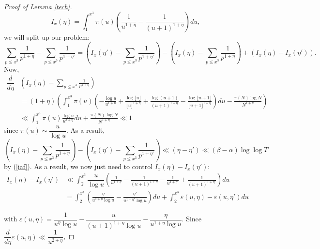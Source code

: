 \documentclass{article}
\newcommand{\1}{\mathds{1}}
\numberwithin{equation}{section}
\newcommand{\eps}{\varepsilon}
\renewcommand{\leq}{\leqslant}
\theoremstyle{plain} %
\begin{document}
\begin{proof}[Proof of Lemma \ref{tech}]
\begin{equation}
    I_x(\eta) = \int_1^{x^3} \pi(u)(\frac{1}{u^{1+\eta}} - \frac{1}{(u+1)^{1 + \eta}})du,
\end{equation}
we will split up our problem:
\begin{equation}
    \sum_{p \leq x^3} \frac{1}{p^{1 + \eta}} - \sum_{p \leq x^3} \frac{1}{p^{1 + \eta'}} = \left(I_x(\eta')  - \sum_{p \leq x^3} \frac{1}{p^{1 + \eta'}} \right) - \left(I_x(\eta)  - \sum_{p \leq x^3} \frac{1}{p^{1 + \eta}} \right) + (I_x(\eta) - I_x(\eta')).
\end{equation}
Now,
\begin{equation}
    \begin{split}
        \dfrac{d}{d\eta} & \left(I_x(\eta)  - \sum_{p \leq x^3} \frac{1}{p^{1 + \eta}} \right) \\
        & = (1 + \eta) \left( \int_{1}^{x^3}\pi(u) (-\frac{\log u}{u^{1 + \eta}} + \frac{\log \lfloor u \rfloor}{\lfloor u\rfloor^{1 + \eta}} + \frac{\log (u+1)}{(u+1)^{1+\eta}} - \frac{\log \lfloor u+1 \rfloor}{\lfloor u+1\rfloor ^{1+\eta}}) du - \frac{\pi(N) \log N}{N^{1 + \eta}} \right) \\
        & \ll \int_{1}^{x^3}\pi(u) \frac{\log u}{u^{3+\eta}}du + \frac{\pi(N)\log N}{N^{1+\eta}} \ll 1
    \end{split}
\end{equation}
since $\pi(u) \sim \dfrac{u}{\log u}$. As a result,
\begin{equation}
    \left(I_x(\eta)  - \sum_{p \leq x^3} \frac{1}{p^{1 + \eta}} \right) - \left(I_x(\eta')  - \sum_{p \leq x^3} \frac{1}{p^{1 + \eta'}} \right) \ll (\eta - \eta') \ll (\beta - \alpha) \log \log T
\end{equation}
by (\ref{iaf}). As a result, we now just need to control $I_x(\eta) - I_x(\eta')$:
\begin{equation}
\begin{split}
    I_x(\eta) - I_x(\eta') & \ll \int_{2}^{x^3} \dfrac{u}{\log u}\left(\frac{1}{u^{1 + \eta}} - \frac{1}{(u+1)^{1 + \eta}} - \frac{1}{u^{1 + \eta'}} + \frac{1}{(u+1)^{1 + \eta'}} \right) du \\
    & = \int_2^{x^3} \left(\frac{\eta}{u^{1 + \eta} \log u} - \frac{\eta'}{u^{1 + \eta'}\log u} \right) du + \int_2^{x^3} \eps(u, \eta) - \eps(u, \eta')du
\end{split}
\end{equation}

with $\eps(u, \eta) = \dfrac{1}{u^{\eta} \log u} - \dfrac{u}{(u+1)^{1 + \eta} \log u} - \dfrac{\eta}{u^{1 + \eta} \log u}$. Since $\dfrac{d}{d \eta} \eps(u, \eta) \ll \dfrac{1}{u^{2 + \eta}}$,


\end{proof}
\end{document}
